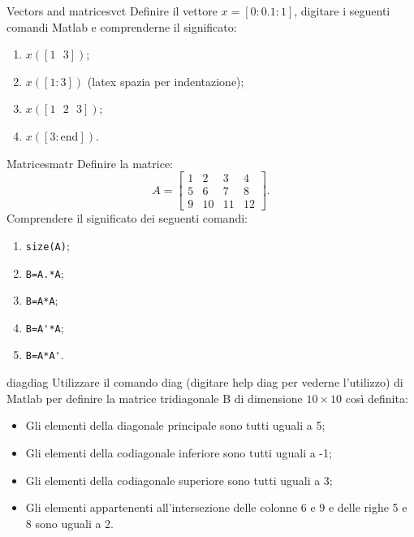\begin{qst}{Vectors and matrices}{vct}
    Definire il vettore $ x=[0:0.1:1] $, digitare i seguenti comandi Matlab e comprenderne il significato:
    \begin{enumerate}
        \item $ x([1\text{ }3]) $;
        \item $ x([1:3]) $ (latex spazia per indentazione);
        \item $ x([1 \text{ } 2 \text{ } 3]) $;
        \item $ x([3: \text{end}]) $.
    \end{enumerate}
\end{qst}
\begin{sol}\end{sol}

\begin{qst}{Matrices}{matr}
    Definire la matrice:
    \[
        A=
        \begin{bmatrix}
            1 & 2  & 3  & 4  \\
            5 & 6  & 7  & 8  \\
            9 & 10 & 11 & 12
        \end{bmatrix}
        .\]
    Comprendere il significato dei seguenti comandi:
    \begin{enumerate}
        \item \verb|size(A)|;
        \item \verb|B=A.*A|;
        \item \verb|B=A*A|;
        \item \verb|B=A'*A|;
        \item \verb|B=A*A'|.
    \end{enumerate}
\end{qst}

\begin{qst}{diag}{diag}
    Utilizzare il comando diag (digitare help diag per vederne l'utilizzo) di Matlab per definire
    la matrice tridiagonale B di dimensione $ 10 \times 10 $  così definita:
    \begin{itemize}
        \item Gli elementi della diagonale principale sono tutti uguali a 5;
        \item Gli elementi della codiagonale inferiore sono tutti uguali a -1;
        \item Gli elementi della codiagonale superiore sono tutti uguali a 3;
        \item Gli elementi appartenenti all'intersezione delle colonne 6 e 9 e delle righe 5 e 8 sono uguali a 2.
    \end{itemize}
\end{qst}


